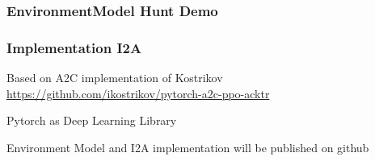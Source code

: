 \begin{frame}
    \frametitle{EnvironmentModel Hunt Demo}
    
\end{frame}
\clearpage

\begin{frame}
    \frametitle{Implementation I2A}

\begin{PraesentationAufzaehlung}
	\item Based on A2C implementation of Kostrikov \url{https://github.com/ikostrikov/pytorch-a2c-ppo-acktr} 
	\item Pytorch as Deep Learning Library
	\item Environment Model and I2A implementation will be published on github
\end{PraesentationAufzaehlung}
    
\end{frame}
\clearpage


